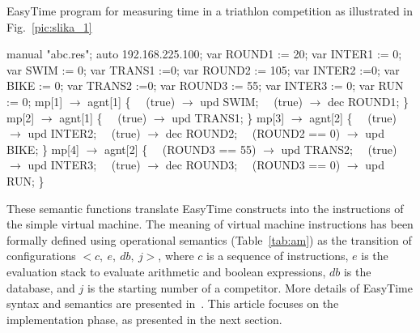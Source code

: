 \documentclass[preprint, prX]{revtex4}
\begin{document}
\begin{algorithm}[htb]
\caption{EasyTime program for measuring time in a triathlon competition as illustrated in Fig.~\ref{pic:slika_1}}
\label{alg:prog}
\scriptsize
\begin{algorithmic}[1]
 manual "abc.res";
 auto 192.168.225.100;
\STATE
\STATE var ROUND1 := 20;
\STATE var INTER1 := 0;
\STATE var SWIM := 0;
\STATE var TRANS1 :=0;
\STATE var ROUND2 := 105;
\STATE var INTER2 :=0;
\STATE var BIKE := 0;
\STATE var TRANS2 :=0;
\STATE var ROUND3 := 55;
\STATE var INTER3 := 0;
\STATE var RUN := 0;
\STATE
\STATE mp[1] $\rightarrow$ agnt[1] \{
\STATE \ \ (true) $\rightarrow$ upd SWIM;
\STATE \ \ (true) $\rightarrow$ dec ROUND1;
\STATE \}
\STATE mp[2] $\rightarrow$ agnt[1] \{
\STATE \ \ (true) $\rightarrow$  upd TRANS1;
\STATE \}
\STATE mp[3] $\rightarrow$  agnt[2] \{
\STATE \ \ (true) $\rightarrow$  upd INTER2;
\STATE \ \ (true) $\rightarrow$  dec ROUND2;
\STATE \ \ (ROUND2 == 0) $\rightarrow$  upd BIKE;
\STATE \}
\STATE mp[4] $\rightarrow$  agnt[2] \{
\STATE \ \ (ROUND3 == 55) $\rightarrow$  upd TRANS2;
\STATE \ \ (true) $\rightarrow$  upd INTER3;
\STATE \ \ (true) $\rightarrow$  dec ROUND3;
\STATE \ \ (ROUND3 == 0) $\rightarrow$  upd RUN;
\STATE \}
\end{algorithmic}
\normalsize
\end{algorithm}


These semantic functions translate EasyTime constructs into the instructions of the simple virtual machine. The meaning of virtual machine instructions has been formally defined using operational semantics (Table~\ref{tab:am}) as the transition of configurations $<c,~e,~db,~j>$, where $c$ is a sequence of instructions, $e$ is the evaluation stack to evaluate arithmetic and boolean expressions, $db$ is the database, and $j$ is the starting number of a competitor. More details of EasyTime syntax and semantics are presented in~\cite{Fister:2011}. This article focuses on the implementation phase, as presented in the next section.
\end{document}

